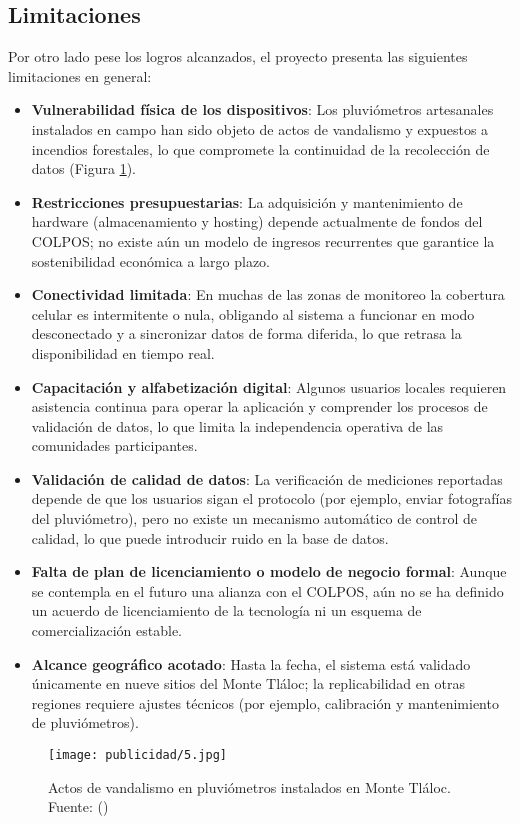 \subsection{Limitaciones}
Por otro lado pese los logros alcanzados, el proyecto presenta las siguientes limitaciones en general:

\begin{itemize}
  \item \textbf{Vulnerabilidad física de los dispositivos}: Los pluviómetros artesanales instalados en campo han sido objeto de actos de vandalismo y expuestos a incendios forestales, lo que compromete la continuidad de la recolección de datos (Figura \ref{publicidad5}).  
  \item \textbf{Restricciones presupuestarias}: La adquisición y mantenimiento de hardware (almacenamiento y hosting) depende actualmente de fondos del COLPOS; no existe aún un modelo de ingresos recurrentes que garantice la sostenibilidad económica a largo plazo.  
  \item \textbf{Conectividad limitada}: En muchas de las zonas de monitoreo la cobertura celular es intermitente o nula, obligando al sistema a funcionar en modo desconectado y a sincronizar datos de forma diferida, lo que retrasa la disponibilidad en tiempo real.  
  \item \textbf{Capacitación y alfabetización digital}: Algunos usuarios locales requieren asistencia continua para operar la aplicación y comprender los procesos de validación de datos, lo que limita la independencia operativa de las comunidades participantes.  
  \item \textbf{Validación de calidad de datos}: La verificación de mediciones reportadas depende de que los usuarios sigan el protocolo (por ejemplo, enviar fotografías del pluviómetro), pero no existe un mecanismo automático de control de calidad, lo que puede introducir ruido en la base de datos.  
  \item \textbf{Falta de plan de licenciamiento o modelo de negocio formal}: Aunque se contempla en el futuro una alianza con el COLPOS, aún no se ha definido un acuerdo de licenciamiento de la tecnología ni un esquema de comercialización estable.  
  \item \textbf{Alcance geográfico acotado}: Hasta la fecha, el sistema está validado únicamente en nueve sitios del Monte Tláloc; la replicabilidad en otras regiones requiere ajustes técnicos (por ejemplo, calibración y mantenimiento de pluviómetros).  
\end{itemize}

\begin{figure}[h!]
\centering
  \texttt{[image: publicidad/5.jpg]}
  \caption{Actos de vandalismo en pluviómetros instalados en Monte Tláloc. Fuente: (\cite{Informativonacional2025})}
  \label{publicidad5}
\end{figure}
